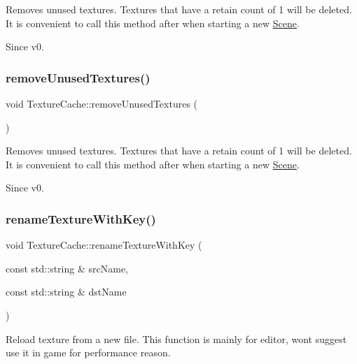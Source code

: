 Removes unused textures. Textures that have a retain count of 1 will be deleted. It is convenient to call this method after when starting a new \hyperlink{classScene}{Scene}. \begin{DoxySince}{Since}
v0. 
\end{DoxySince}
\mbox{\label{classTextureCache_acbec791c5421295c030e097716787f68}} 
\subsubsection{\texorpdfstring{remove\+Unused\+Textures()}{removeUnusedTextures()}\hspace{0.1cm}{\footnotesize\ttfamily [2/2]}}
{\footnotesize\ttfamily void Texture\+Cache\+::remove\+Unused\+Textures (\begin{DoxyParamCaption}{ }\end{DoxyParamCaption})}

Removes unused textures. Textures that have a retain count of 1 will be deleted. It is convenient to call this method after when starting a new \hyperlink{classScene}{Scene}. \begin{DoxySince}{Since}
v0. 
\end{DoxySince}
\mbox{\label{classTextureCache_a8735ea61a274834e6b3db7165ce2c26d}} 
\subsubsection{\texorpdfstring{rename\+Texture\+With\+Key()}{renameTextureWithKey()}\hspace{0.1cm}{\footnotesize\ttfamily [1/2]}}
{\footnotesize\ttfamily void Texture\+Cache\+::rename\+Texture\+With\+Key (\begin{DoxyParamCaption}\item[{const std\+::string \&}]{src\+Name,  }\item[{const std\+::string \&}]{dst\+Name }\end{DoxyParamCaption})}

Reload texture from a new file. This function is mainly for editor, won\textquotesingle{}t suggest use it in game for performance reason.


